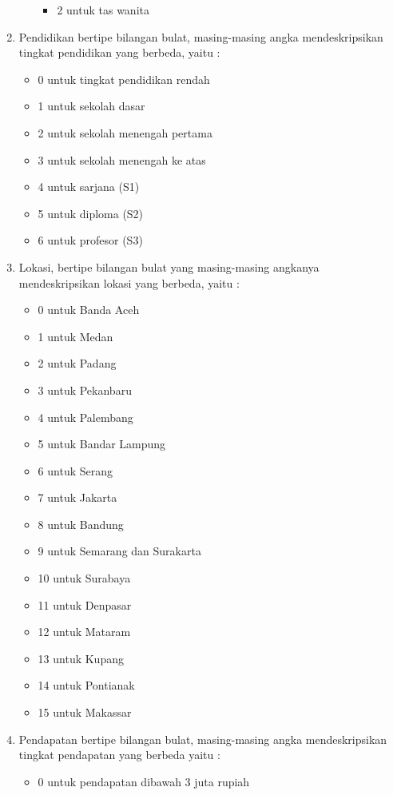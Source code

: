 \begin{enumerate}
\begin{itemize}
\begin{itemize}
					\item 2 untuk tas wanita
				\end{itemize}
		\end{itemize}
		\item Pendidikan bertipe bilangan bulat, masing-masing angka mendeskripsikan tingkat pendidikan yang berbeda, yaitu :
		\begin{itemize}
					\item 0 untuk tingkat pendidikan rendah
					\item 1 untuk sekolah dasar
					\item 2 untuk sekolah menengah pertama
					\item 3 untuk sekolah menengah ke atas
					\item 4 untuk sarjana (S1)
					\item 5 untuk diploma (S2)
					\item 6 untuk profesor (S3)
				\end{itemize}
		\item Lokasi, bertipe bilangan bulat yang masing-masing angkanya mendeskripsikan lokasi yang berbeda, yaitu :
			\begin{itemize}
				\item 0 untuk Banda Aceh
				\item 1 untuk Medan
				\item 2 untuk Padang
				\item 3 untuk Pekanbaru
				\item 4 untuk Palembang
				\item 5 untuk Bandar Lampung
				\item 6 untuk Serang
				\item 7 untuk Jakarta
				\item 8 untuk Bandung
				\item 9 untuk Semarang dan Surakarta
				\item 10 untuk Surabaya
				\item 11 untuk Denpasar
				\item 12 untuk Mataram
				\item 13 untuk Kupang
				\item 14 untuk Pontianak
				\item 15 untuk Makassar
			\end{itemize}
		\item Pendapatan bertipe bilangan bulat, masing-masing angka mendeskripsikan tingkat pendapatan yang berbeda yaitu :
			\begin{itemize}
			\item 0 untuk pendapatan dibawah 3 juta rupiah

\end{itemize}
\end{enumerate}
